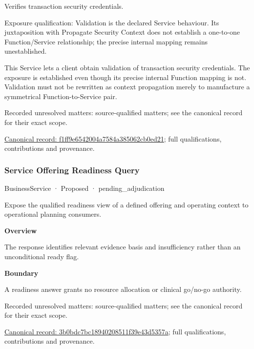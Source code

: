 Verifies transaction security credentials.



Exposure qualification: Validation is the declared Service behaviour. Its juxtaposition with Propagate Security Context does not establish a one-to-one Function/Service relationship; the precise internal mapping remains unestablished.



This Service lets a client obtain validation of transaction security credentials. The exposure is established even though its precise internal Function mapping is not. Validation must not be rewritten as context propagation merely to manufacture a symmetrical Function-to-Service pair.


{\small Recorded unresolved matters: source-qualified matters; see the canonical record for their exact scope.}\par
{\footnotesize \href{../../../../continuum/business/business-service/f1ff9e6542004a7584a385062cb0ed21.md}{Canonical record: f1ff9e6542004a7584a385062cb0ed21}; full qualifications, contributions and provenance.}\par
\subsubsection{Service Offering Readiness Query}

\label{element:3b0bdc7bc18940208511f39e43d5357a}
{\small BusinessService · Proposed · pending\_adjudication}\par

Expose the qualified readiness view of a defined offering and operating context to operational planning consumers.



\textbf{Overview}



The response identifies relevant evidence basis and insufficiency rather than an unconditional ready flag.



\textbf{Boundary}



A readiness answer grants no resource allocation or clinical go/no-go authority.


{\small Recorded unresolved matters: source-qualified matters; see the canonical record for their exact scope.}\par
{\footnotesize \href{../../../../continuum/business/business-service/3b0bdc7bc18940208511f39e43d5357a.md}{Canonical record: 3b0bdc7bc18940208511f39e43d5357a}; full qualifications, contributions and provenance.}\par
